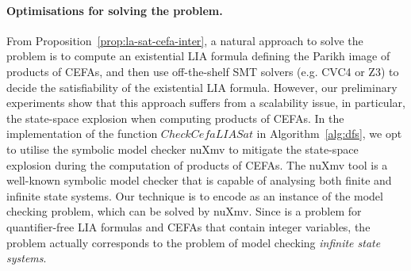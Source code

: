 

\paragraph*{Optimisations for solving the {\lasat} problem.} From Proposition~\ref{prop:la-sat-cefa-inter}, a natural approach to solve the {\lasat} problem is to compute an existential LIA formula defining the Parikh image of products of CEFAs, and then use off-the-shelf SMT solvers (e.g. CVC4 or Z3) to decide the satisfiability of the existential LIA formula. %
However, our preliminary experiments show that this approach suffers from a scalability issue, in particular, %
the state-space explosion when computing products of CEFAs.  %
In the implementation of the function $\mathit{CheckCefaLIASat}$ in Algorithm~\ref{alg:dfs},  we %
opt to utilise the symbolic model checker nuXmv \cite{nuxmv} to mitigate the state-space explosion during the computation of products of CEFAs. The nuXmv tool is a well-known symbolic model checker that is capable of analysing both finite and infinite state systems. Our technique is to encode {\lasat} as an instance of the model checking problem, which can  be solved by %
nuXmv. Since  {\lasat} is a problem for quantifier-free LIA formulas and CEFAs that contain integer variables, the {\lasat} problem actually corresponds to the problem of model checking \emph{infinite state systems}. 
%
%



%
%
%


%
%
%
%
%
%
%
%
%
%


